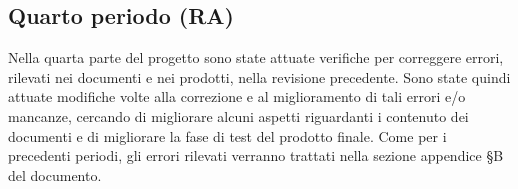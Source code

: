 \documentclass[../piano-di-qualifica.tex]{subfiles}
\begin{document}
\subsection{Quarto periodo (RA)}
\label{sub:terzo_periodo}
Nella quarta parte del progetto sono state attuate verifiche per correggere errori, rilevati nei documenti e nei prodotti, nella revisione precedente.
Sono state quindi attuate modifiche volte alla correzione e al miglioramento di tali errori e/o mancanze, cercando di migliorare alcuni aspetti riguardanti i contenuto dei documenti e di migliorare la fase di test del prodotto finale.
Come per i precedenti periodi, gli errori rilevati verranno trattati nella sezione appendice §B del documento.

\end{document}
